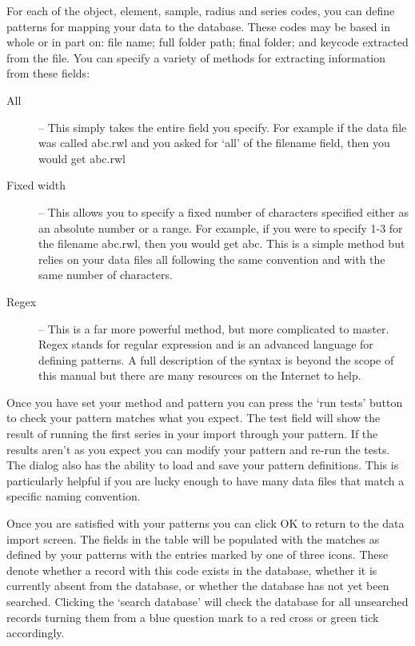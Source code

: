 For each of the object, element, sample, radius and series codes, you can define patterns for mapping your data to the database.  These codes may be based in whole or in part on: file name; full folder path; final folder; and keycode extracted from the file.  You can specify a variety of methods for extracting information from these fields:

\begin{description}
\item[All] -- This simply takes the entire field you specify.  For example if the data file was called abc.rwl and you asked for `all' of the filename field, then you would get abc.rwl
\item[Fixed width] -- This allows you to specify a fixed number of characters specified either as an absolute number or a range.  For example, if you were to specify  1-3 for the filename abc.rwl, then you would get abc.  This is a simple method but relies on your data files all following the same convention and with the same number of characters.
\item[Regex] -- This is a far more powerful method, but more complicated to master.  Regex stands for regular expression and is an advanced language for defining patterns.  A full description of the syntax is beyond the scope of this manual but there are many resources on the Internet to help.   
\end{description}

Once you have set your method and pattern you can press the `run tests' button to check your pattern matches what you expect.  The test field will show the result of running the first series in your import through your pattern.  If the results aren't as you expect you can modify your pattern and re-run the tests.  The dialog also has the ability to load and save your pattern definitions.  This is particularly helpful if you are lucky enough to have many data files that match a specific naming convention.

Once you are satisfied with your patterns you can click OK to return to the data import screen.  The fields in the table will be populated with the matches as defined by your patterns with the entries marked by one of three icons.  These denote whether a record with this code exists in the database, whether it is currently absent from the database, or whether the database has not yet been searched.  Clicking the `search database' will check the database for all unsearched records turning them from a blue question mark to a red cross or green tick accordingly.  

